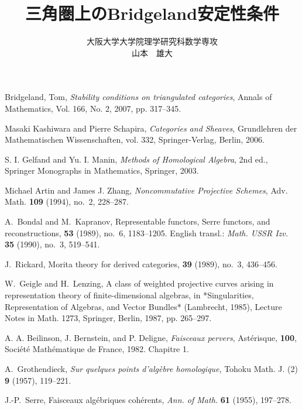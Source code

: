 \documentclass[eqno]{ltjsarticle}
\begin{document}
\title{三角圏上のBridgeland安定性条件}
\date{}
\author{大阪大学大学院理学研究科数学専攻\\山本　雄大}
\maketitle
\tableofcontents










\begin{thebibliography}{99}
	Bridgeland, Tom,
		\textit{Stability conditions on triangulated categories},
	Annals of Mathematics, Vol. 166, No. 2, 2007, pp. 317–345.

	Masaki Kashiwara and Pierre Schapira,
		\textit{Categories and Sheaves},
	Grundlehren der Mathematischen Wissenschaften, vol. 332,
	Springer-Verlag, Berlin, 2006.

	S. I. Gelfand and Yu. I. Manin,
	\textit{Methods of Homological Algebra}, 2nd ed.,
	Springer Monographs in Mathematics, Springer, 2003.

	Michael Artin and James J. Zhang,
	\textit{Noncommutative Projective Schemes},
	Adv. Math. \textbf{109} (1994), no.~2, 228--287.

	A.~Bondal and M.~Kapranov,
	\newblock Representable functors, Serre functors, and reconstructions,
	 \textbf{53} (1989), no.~6, 1183--1205.
	\newblock English transl.: {\em Math. USSR Izv.} \textbf{35} (1990), no.~3, 519--541.

	J.~Rickard,
	\newblock Morita theory for derived categories,
	 \textbf{39} (1989), no.~3, 436--456.


	W.~Geigle and H.~Lenzing,
	\newblock A class of weighted projective curves arising in representation theory of finite-dimensional algebras,
	\newblock in *Singularities, Representation of Algebras, and Vector Bundles* (Lambrecht, 1985), Lecture Notes in Math. 1273, Springer, Berlin, 1987, pp. 265–297.
	
	A. A. Beilinson, J. Bernstein, and P. Deligne,
	\textit{Faisceaux pervers},
	Astérisque, \textbf{100}, Société Mathématique de France, 1982. Chapitre 1.

	A.~Grothendieck,
	\textit{Sur quelques points d'algèbre homologique},
	Tohoku Math. J. (2) \textbf{9} (1957), 119--221.

	J.-P.~Serre,
	\newblock Faisceaux algébriques cohérents,
	\newblock \emph{Ann. of Math.} \textbf{61} (1955), 197--278.

\end{thebibliography}
\end{document}
